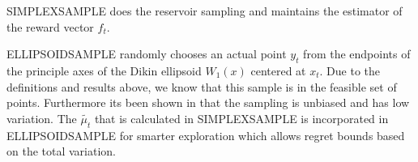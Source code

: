 SIMPLEXSAMPLE does the reservoir sampling and maintains the estimator of the reward vector
$f_t$. 

ELLIPSOIDSAMPLE randomly chooses an actual point $y_t$ from the endpoints of the
principle axes of the Dikin ellipsoid $W_1(x)$ centered at $x_t$. Due to the definitions and 
results above, we know that this sample is in the feasible set of points. Furthermore its been shown in \citep{abernethy} that the sampling is unbiased and has low variation.
The  $\tilde{\mu_t}$ that is calculated in SIMPLEXSAMPLE is incorporated in ELLIPSOIDSAMPLE for smarter exploration which allows regret bounds based on the total
variation.  